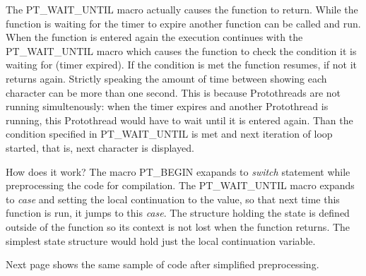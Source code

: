 \newpage

The PT\_WAIT\_UNTIL macro actually causes the function to return.
While the function is waiting for the timer to expire another function can be called and run.
When the function is entered again the execution continues with the PT\_WAIT\_UNTIL macro
which causes the function to check the condition it is waiting for (timer expired).
If the condition is met the function resumes, if not it returns again.
Strictly speaking the amount of time between showing each character can
be more than one second.
This is because Protothreads are not running simultenously: when the timer expires
and another Protothread is running, this Protothread would have to wait until
it is entered again. Than the condition specified in PT\_WAIT\_UNTIL is met and
next iteration of loop started, that is, next character is displayed.

How does it work? The macro PT\_BEGIN exapands to {\it switch} statement while preprocessing the
code for compilation.
The PT\_WAIT\_UNTIL macro expands to {\it case} and setting the local continuation
to the value, so that next time this function is run, it jumps to this {\it case}.
The structure holding the state is defined outside of the function so its context is not lost when
the function returns. The simplest state structure would hold just the local continuation variable.

Next page shows the same sample of code after simplified preprocessing.

\newpage

